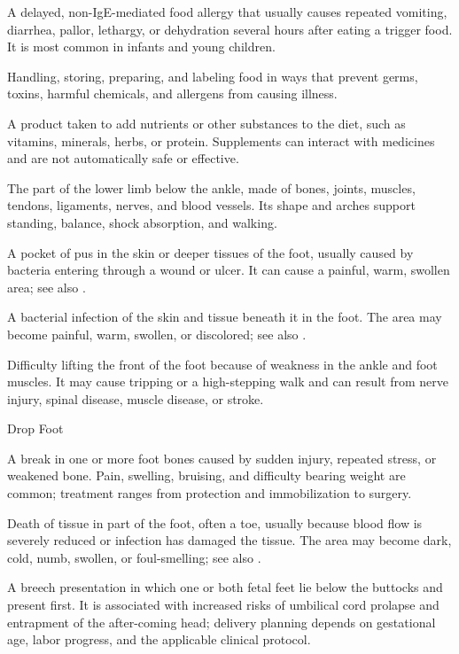  A delayed, non-IgE-mediated food allergy that usually causes repeated vomiting, diarrhea, pallor, lethargy, or dehydration several hours after eating a trigger food. It is most common in infants and young children.

 Handling, storing, preparing, and labeling food in ways that prevent germs, toxins, harmful chemicals, and allergens from causing illness.

 A product taken to add nutrients or other substances to the diet, such as vitamins, minerals, herbs, or protein. Supplements can interact with medicines and are not automatically safe or effective.

 The part of the lower limb below the ankle, made of bones, joints, muscles, tendons, ligaments, nerves, and blood vessels. Its shape and arches support standing, balance, shock absorption, and walking.

 A pocket of pus in the skin or deeper tissues of the foot, usually caused by bacteria entering through a wound or ulcer. It can cause a painful, warm, swollen area; see also .

 A bacterial infection of the skin and tissue beneath it in the foot. The area may become painful, warm, swollen, or discolored; see also .

 Difficulty lifting the front of the foot because of weakness in the ankle and foot muscles. It may cause tripping or a high-stepping walk and can result from nerve injury, spinal disease, muscle disease, or stroke.

\synonyms
Drop Foot

 A break in one or more foot bones caused by sudden injury, repeated stress, or weakened bone. Pain, swelling, bruising, and difficulty bearing weight are common; treatment ranges from protection and immobilization to surgery.

 Death of tissue in part of the foot, often a toe, usually because blood flow is severely reduced or infection has damaged the tissue. The area may become dark, cold, numb, swollen, or foul-smelling; see also .

 A breech presentation in which one or both fetal feet lie below the buttocks and present first. It is associated with increased risks of umbilical cord prolapse and entrapment of the after-coming head; delivery planning depends on gestational age, labor progress, and the applicable clinical protocol.

